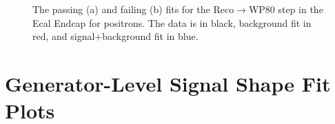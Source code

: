 \begin{thebibliography}{10}
\begin{figure}[htb]
  \begin{center}
    \caption{The passing (a) and failing (b) fits for the Reco$\to$WP80 step in the Ecal Endcap for positrons.
             The data is in black, background fit in red, and signal+background fit in blue.}
  \end{center}
\end{figure}

\clearpage
\newpage

\section{Generator-Level Signal Shape Fit Plots }
\label{genShapePlots}


\end{thebibliography}

